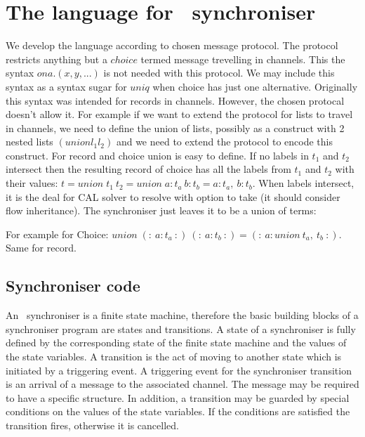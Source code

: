 \section{The language for \ak\ synchroniser}
We develop the language according to chosen message protocol. The protocol restricts anything but a $choice$ termed message trevelling in channels. This the syntax $on a.(x,y, ...)$ is not needed with this protocol. We may include this syntax as a syntax sugar for $uniq$ when choice has just one alternative. Originally this syntax was intended for records in channels. However, the chosen protocal doesn't allow it. For example if we want to extend the protocol for lists to travel in channels, we need to define the union of lists, possibly as a construct with 2 nested lists $(union l_1 l_2)$ and we need to extend the protocol to encode this construct. For record and choice union is easy to define. If no labels in $t_1$ and $t_2$ intersect then the resulting record of choice has all the labels from $t_1$ and $t_2$ with their values: $t = union \; t_1 \: t_2 = union \; {a:t_a} \: {b:t_b} = {a:t_a, \: b:t_b}$. When labels intersect, it is the deal for CAL solver to resolve with option to take (it should consider flow inheritance). The synchroniser just leaves it to be a union of terms:

For example for Choice: $union \; (: \: a:t_a \: :) \: (: \: a:t_b \: :) = (: \: a:union \: t_a, \: t_b \: :)$.
Same for record.


\subsection{Synchroniser code}
An \ak\ synchroniser is a finite state machine, therefore the basic building blocks of a synchroniser program are states and transitions. A state of a synchroniser is fully defined by the corresponding state of the finite state machine and the values of the state variables. A transition is the act of moving to another state which is initiated by a triggering event. A triggering event for the synchroniser transition is an arrival of a message to the associated channel. The message may be required to have a specific structure. In addition, a transition may be guarded by special conditions on the values of the state variables. If the conditions are satisfied the transition fires, otherwise it is cancelled.

